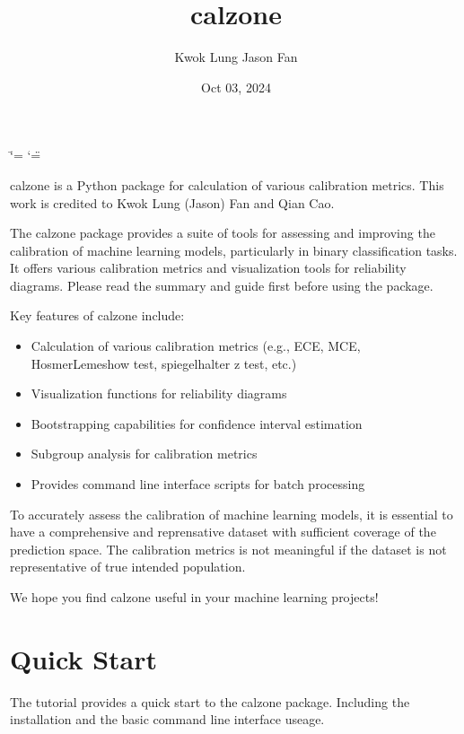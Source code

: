 \documentclass[letterpaper,10pt,english]{sphinxmanual}
\title{calzone}
\date{Oct 03, 2024}
\author{Kwok Lung Jason Fan}
\begin{document}
\ifdefined\shorthandoff
  \ifnum\catcode`\=\string=\active\shorthandoff{=}\fi
  \ifnum\catcode`\"=\active{}\fi
\fi

\pagestyle{empty}
\sphinxmaketitle
\pagestyle{plain}
\sphinxtableofcontents
\pagestyle{normal}
\label{\detokenize{index::doc}}


\sphinxAtStartPar
calzone is a Python package for calculation of various calibration metrics. This work is credited to Kwok Lung (Jason) Fan and Qian Cao.

\sphinxAtStartPar
The calzone package provides a suite of tools for assessing and improving the calibration of machine learning models, particularly in binary classification tasks. It offers various calibration metrics and visualization tools for reliability diagrams.  Please read the summary and guide first  before using the package.

\sphinxAtStartPar
Key features of calzone include:
\begin{itemize}
\item {} 
\sphinxAtStartPar
Calculation of various calibration metrics (e.g., ECE, MCE, Hosmer\sphinxhyphen{}Lemeshow test, spiegelhalter z test, etc.)

\item {} 
\sphinxAtStartPar
Visualization functions for reliability diagrams

\item {} 
\sphinxAtStartPar
Bootstrapping capabilities for confidence interval estimation

\item {} 
\sphinxAtStartPar
Subgroup analysis for calibration metrics

\item {} 
\sphinxAtStartPar
Provides command line interface scripts for batch processing

\end{itemize}

\sphinxAtStartPar
To accurately assess the calibration of machine learning models, it is essential to have a comprehensive and reprensative dataset with sufficient coverage of the prediction space. The calibration metrics is not meaningful if the dataset is not representative of true intended population.

\sphinxAtStartPar
We hope you find calzone useful in your machine learning projects!

\sphinxstepscope


\chapter{Quick Start}
\label{\detokenize{notebooks/quickstart:Quick-Start}}\label{\detokenize{notebooks/quickstart::doc}}
\sphinxAtStartPar
The tutorial provides a quick start to the calzone package. Including the installation and the basic command line interface useage.
\end{document}
